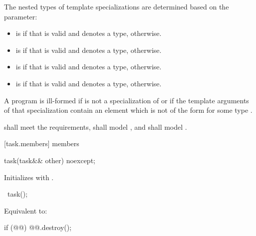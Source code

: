 \pnum
The nested types of  template specializations
are determined based on the  parameter:
\begin{itemize}
\item {} is 
if that  is valid and denotes a type,
 otherwise.
\item {} is 
if that  is valid and denotes a type,
 otherwise.
\item {} is 
if that  is valid and denotes a type,
 otherwise.
\item {} is  if
that  is valid and denotes a type,
 otherwise.
\end{itemize}

\pnum
 A program is ill-formed if  is not a
specialization of 
or if the template arguments of that specialization
contain an element which is not of the form
 for some type .

\pnum
{} shall meet the  requirements,
 shall model , and
 shall model .

[task.members]{ members}

%
\begin{itemdecl}
task(task&& other) noexcept;
\end{itemdecl}
\begin{itemdescr}
\pnum
\effects
Initializes  with .
\end{itemdescr}

%
\begin{itemdecl}
~task();
\end{itemdecl}
\begin{itemdescr}
\pnum
\effects
Equivalent to:
\begin{codeblock}
if (@@)
  @@.destroy();
\end{codeblock}
\end{itemdescr}

